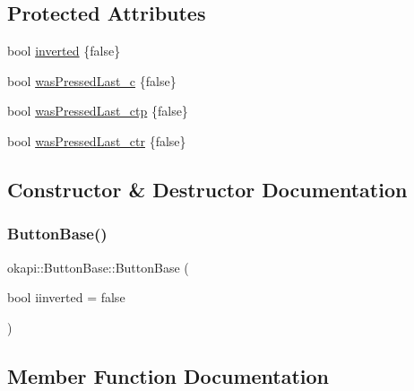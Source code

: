 \subsection*{Protected Attributes}
\begin{DoxyCompactItemize}
\item 
bool \mbox{\hyperlink{classokapi_1_1ButtonBase_a6eca82b96f124416c295520de271e91d}{inverted}} \{false\}
\item 
bool \mbox{\hyperlink{classokapi_1_1ButtonBase_a21864143d48104dfe9b7dd7b6b52fe7f}{was\+Pressed\+Last\+\_\+c}} \{false\}
\item 
bool \mbox{\hyperlink{classokapi_1_1ButtonBase_a12c3c9abdb6937795849d0a3442bc7d0}{was\+Pressed\+Last\+\_\+ctp}} \{false\}
\item 
bool \mbox{\hyperlink{classokapi_1_1ButtonBase_ac6cc2a03f469e31fa0be8719716e4dfc}{was\+Pressed\+Last\+\_\+ctr}} \{false\}
\end{DoxyCompactItemize}


\subsection{Constructor \& Destructor Documentation}
\mbox{\label{classokapi_1_1ButtonBase_a6327e273244bac5ca425f23999807849}} 
\subsubsection{\texorpdfstring{ButtonBase()}{ButtonBase()}}
{\footnotesize\ttfamily okapi\+::\+Button\+Base\+::\+Button\+Base (\begin{DoxyParamCaption}\item[{bool}]{iinverted = {\ttfamily false} }\end{DoxyParamCaption})\hspace{0.3cm}{\ttfamily [explicit]}}



\subsection{Member Function Documentation}
\mbox{\label{classokapi_1_1ButtonBase_a0d70e238573b2454fec934a6a7b2338d}} 
